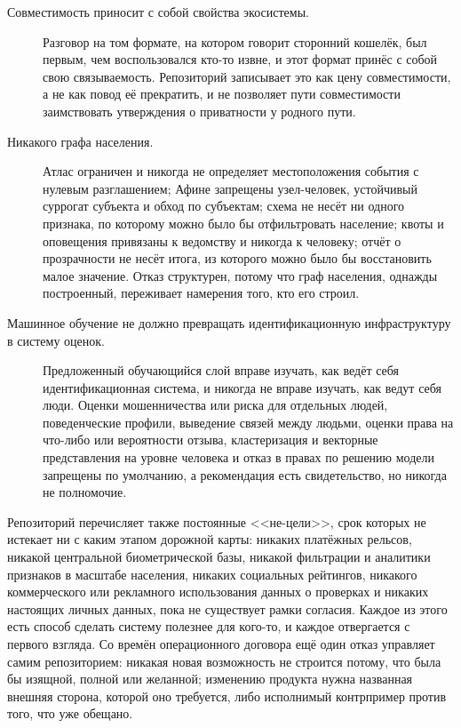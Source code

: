 \begin{description}
  \item[Совместимость приносит с собой свойства экосистемы.] Разговор на том формате, на котором
    говорит сторонний кошелёк, был первым, чем воспользовался кто-то извне, и этот формат принёс с
    собой свою связываемость. Репозиторий записывает это как цену совместимости, а не как повод её
    прекратить, и не позволяет пути совместимости заимствовать утверждения о приватности у родного
    пути.
  \item[Никакого графа населения.] Атлас ограничен и никогда не определяет местоположения события
    с нулевым разглашением; Афине запрещены узел-человек, устойчивый суррогат субъекта и обход по
    субъектам; схема не несёт ни одного признака, по которому можно было бы отфильтровать население;
    квоты и оповещения привязаны к ведомству и никогда к человеку; отчёт о прозрачности не несёт
    итога, из которого можно было бы восстановить малое значение. Отказ структурен, потому что граф
    населения, однажды построенный, переживает намерения того, кто его строил.
  \item[Машинное обучение не должно превращать идентификационную инфраструктуру в систему оценок.]
    Предложенный обучающийся слой вправе изучать, как ведёт себя идентификационная система, и
    никогда не вправе изучать, как ведут себя люди. Оценки мошенничества или риска для отдельных
    людей, поведенческие профили, выведение связей между людьми, оценки права на что-либо или
    вероятности отзыва, кластеризация и векторные представления на уровне человека и отказ в правах
    по решению модели запрещены по умолчанию, а рекомендация есть свидетельство, но никогда не
    полномочие.
\end{description}

Репозиторий перечисляет также постоянные <<не-цели>>, срок которых не истекает ни с каким этапом
дорожной карты: никаких платёжных рельсов, никакой центральной биометрической базы, никакой
фильтрации и аналитики признаков в масштабе населения, никаких социальных рейтингов, никакого
коммерческого или рекламного использования данных о проверках и никаких настоящих личных данных,
пока не существует рамки согласия. Каждое из этого есть способ сделать систему полезнее для
кого-то, и каждое отвергается с первого взгляда. Со времён операционного договора ещё один отказ
управляет самим репозиторием: никакая новая возможность не строится потому, что была бы изящной,
полной или желанной; изменению продукта нужна названная внешняя сторона, которой оно требуется,
либо исполнимый контрпример против того, что уже обещано.

